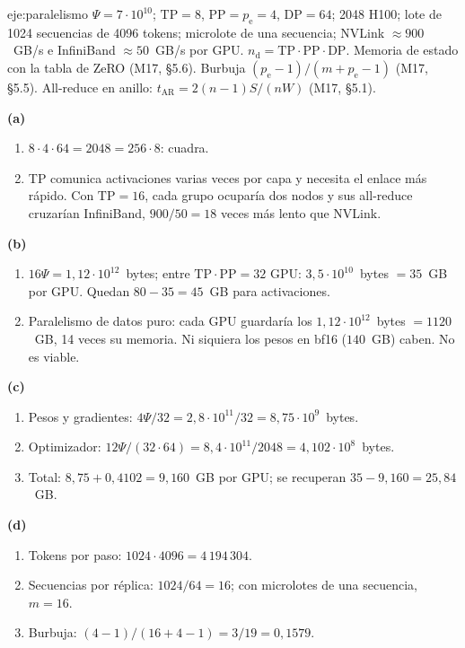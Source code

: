 \begin{solucion}{eje:paralelismo}
\datos $\Psi=7\cdot 10^{10}$; $\mathrm{TP}=8$, $\mathrm{PP}=p_{\mathrm{e}}=4$, $\mathrm{DP}=64$; 2048 H100; lote de 1024 secuencias de 4096 tokens; microlote de una secuencia; NVLink $\approx 900$~GB/s e InfiniBand $\approx 50$~GB/s por GPU.
\planteamiento $n_{\mathrm{d}}=\mathrm{TP}\cdot\mathrm{PP}\cdot\mathrm{DP}$. Memoria de estado con la tabla de ZeRO (M17, §5.6). Burbuja $(p_{\mathrm{e}}-1)/(m+p_{\mathrm{e}}-1)$ (M17, §5.5). All-reduce en anillo: $t_{\mathrm{AR}}=2(n-1)S/(nW)$ (M17, §5.1).
\pasos

\noindent\textbf{(a)}
\begin{enumerate}[label=\arabic*.]
  \item $8\cdot 4\cdot 64=2048=256\cdot 8$: cuadra.
  \item TP comunica activaciones varias veces por capa y necesita el enlace más rápido. Con $\mathrm{TP}=16$, cada grupo ocuparía dos nodos y sus all-reduce cruzarían InfiniBand, $900/50=18$ veces más lento que NVLink.
\end{enumerate}

\noindent\textbf{(b)}
\begin{enumerate}[label=\arabic*.]
  \item $16\Psi=1{,}12\cdot 10^{12}$~bytes; entre $\mathrm{TP}\cdot\mathrm{PP}=32$ GPU: $3{,}5\cdot 10^{10}$~bytes $=35$~GB por GPU. Quedan $80-35=45$~GB para activaciones.
  \item Paralelismo de datos puro: cada GPU guardaría los $1{,}12\cdot 10^{12}$~bytes $=1120$~GB, 14 veces su memoria. Ni siquiera los pesos en bf16 ($140$~GB) caben. No es viable.
\end{enumerate}

\noindent\textbf{(c)}
\begin{enumerate}[label=\arabic*.]
  \item Pesos y gradientes: $4\Psi/32=2{,}8\cdot 10^{11}/32=8{,}75\cdot 10^{9}$~bytes.
  \item Optimizador: $12\Psi/(32\cdot 64)=8{,}4\cdot 10^{11}/2048=4{,}102\cdot 10^{8}$~bytes.
  \item Total: $8{,}75+0{,}4102=9{,}160$~GB por GPU; se recuperan $35-9{,}160=25{,}84$~GB.
\end{enumerate}

\noindent\textbf{(d)}
\begin{enumerate}[label=\arabic*.]
  \item Tokens por paso: $1024\cdot 4096=4\,194\,304$.
  \item Secuencias por réplica: $1024/64=16$; con microlotes de una secuencia, $m=16$.
  \item Burbuja: $(4-1)/(16+4-1)=3/19=0{,}1579$.
\end{enumerate}


\end{solucion}
